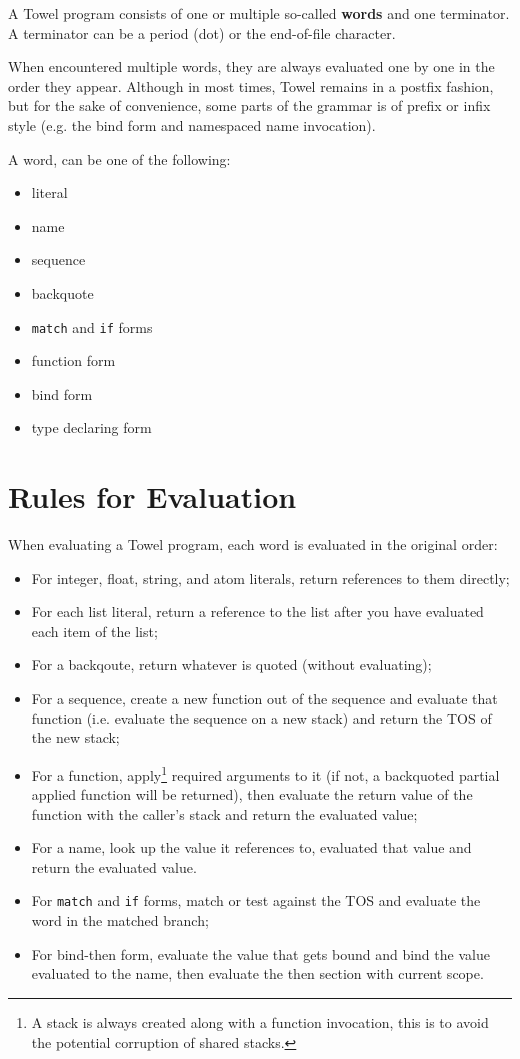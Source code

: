 \documentclass{book}
\begin{document}
A Towel program consists of one or multiple so-called \textbf{words} and one terminator. A terminator can be a period (dot) or the end-of-file character.

When encountered multiple words, they are always evaluated one by one in the order they appear. Although in most times, Towel remains in a postfix fashion, but for the sake of convenience, some parts of the grammar is of prefix or infix style (e.g. the bind form and namespaced name invocation).

A word, can be one of the following:
\begin{itemize}
\item literal
\item name
\item sequence
\item backquote
\item \texttt{match} and \texttt{if} forms
\item function form
\item bind form
\item type declaring form
\end{itemize}

\section{Rules for Evaluation}

When evaluating a Towel program, each word is evaluated in the original order:
\begin{itemize}
\item For integer, float, string, and atom literals, return references to them directly;
\item For each list literal, return a reference to the list after you have evaluated each item of the list;
\item For a backqoute, return whatever is quoted (without evaluating);
\item For a sequence, create a new function out of the sequence and evaluate that function (i.e. evaluate the sequence on a new stack) and return the TOS of the new stack;
\item For a function, apply\footnote{A stack is always created along with a function invocation, this is to avoid the potential corruption of shared stacks.} required arguments to it (if not, a backquoted partial applied function will be returned), then evaluate the return value of the function with the caller's stack and return the evaluated value;
\item For a name, look up the value it references to, evaluated that value and return the evaluated value.
\item For \texttt{match} and \texttt{if} forms, match or test against the TOS and evaluate the word in the matched branch;
\item For bind-then form, evaluate the value that gets bound and bind the value evaluated to the name, then evaluate the then section with current scope.
\end{itemize}
\end{document}
